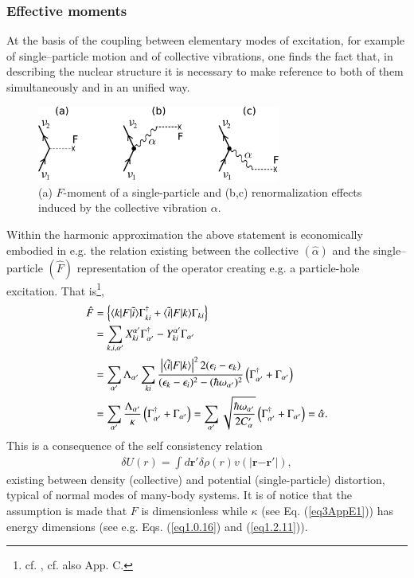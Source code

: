 \subsubsection{Effective moments}
At the basis of the coupling between elementary modes of excitation, for example of single--particle motion and of collective vibrations, one finds the fact that, in describing the nuclear structure it is necessary to make reference to both of them simultaneously and in an unified way.
   \begin{figure}
   \centerline{\includegraphics*[width=8cm,angle=0	]{nutshell/figs/fig3_A_1}}
   \caption{(a) $F$-moment of a single-particle and (b,c) renormalization effects induced by the collective vibration $\alpha$.}\label{fig3.A.1}
   \end{figure}

Within the harmonic approximation the above statement is economically embodied in e.g. the relation existing between the collective $(\hat \alpha)$ and the single--particle $(\hat F)$ representation of the operator creating e.g. a particle-hole excitation. That is\footnote{cf. \cite{Bohr:75}, cf. also \cite{Brink:05} App. C.}, 
\begin{align}\label{eq1AppE1}
\nonumber \hat F&=\left\{\langle {k|F|\tilde i} \rangle\Gamma_{ki}^\dagger+\langle {\tilde i|F|k} \rangle\Gamma_{ki}\right\}\\
\nonumber &=\sum_{k,i,\alpha'}X_{ki}^{\alpha'}\Gamma_{\alpha'}^{\dagger}-Y_{ki}^{\alpha'}\Gamma_{\alpha'}\\
\nonumber &=\sum_{\alpha'}\Lambda_{\alpha'}\sum_{ki}\frac{\left|\langle {\tilde i|F|k} \rangle\right|^22(\epsilon_i-\epsilon_k)}{(\epsilon_k-\epsilon_i)^2-(\hbar\omega_{\alpha'})^2}\left(\Gamma_{\alpha'}^\dagger+\Gamma_{\alpha'}\right)\\
 &=\sum_{\alpha'}\frac{\Lambda_{\alpha'}}{\kappa}\left(\Gamma_{\alpha'}^{\dagger}+\Gamma_{\alpha'}\right)=\sum_{\alpha'}\sqrt{\frac{\hbar\omega_{\alpha'}}{2C_\alpha'}}\left(\Gamma_{\alpha'}^{\dagger}+\Gamma_{\alpha'}\right)=\hat \alpha.
\end{align}
This is a consequence of the self consistency relation
\begin{align}
\delta U(r)=\int d\mathbf r' \delta \rho(r)v(|\mathbf r{-\mathbf r'}|),
\end{align}
existing between density (collective) and potential (single-particle) distortion, typical of normal modes of many-body systems. It is of notice that the assumption is made that $F$ is dimensionless while $\kappa$ (see Eq. (\ref{eq3AppE1})) has energy dimensions (see e.g. Eqs. (\ref{eq1.0.16}) and (\ref{eq1.2.11})).

